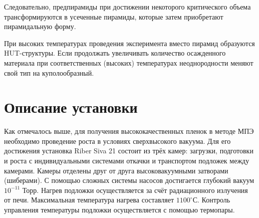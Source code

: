 Следовательно, предпирамиды при достижении некоторого критического объема трансформируются в усеченные пирамиды, которые затем приобретают пирамидальную форму. 


При высоких температурах проведения эксперимента вместо пирамид образуются HUT-структуры. Если продолжать увеличивать количество осажденного материала при соответственных (высоких) температурах неоднородности меняют свой тип на куполообразный. 

\section*{Описание установки} %
Как отмечалось выше, для получения высококачественных пленок в методе МПЭ необходимо проведение роста в условиях сверхвысокого вакуума. Для его достижения установка Riber Siva 21 состоит из трёх камер: загрузки, подготовки и роста с индивидуальными системами откачки и транспортом подложек между камерами. Камеры отделены друг от друга высоковакуумными затворами (шиберами). С помощью сложных системы насосов достигается глубокий вакуум $10^{-11}$ Торр. Нагрев подложки осуществляется за счёт радиационного излучения от печи. Максимальная температура нагрева составляет $1100^{\circ} $С. Контроль управления температуры подложки осуществляется с помощью термопары.  

